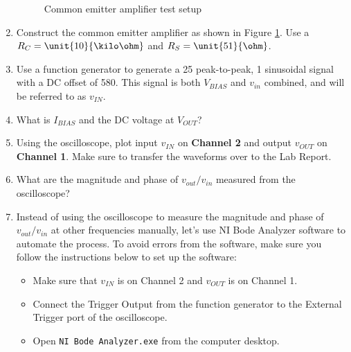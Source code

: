 \documentclass{article}
\begin{document}
\begin{enumerate}

	\begin{figure}[!htb]
		
		\centerline{\box\graph}
		\caption{Common emitter amplifier test setup}
		\label{commonemitter}
	\end{figure}
	
	\item Construct the common emitter amplifier as shown in Figure \ref{commonemitter}. Use a $R_C=\unit{10}{\kilo\ohm}$ and $R_S=\unit{51}{\ohm}$.

	\item Use a function generator to generate a \unit{25}{\milli\volt} peak-to-peak, \unit{1}{\kilo\hertz} sinusoidal signal with a DC offset of \unit{580}{\milli\volt}. This signal is both $V_{BIAS}$ and $v_{in}$ combined, and will be referred to as $v_{IN}$. 
	
	\item What is $I_{BIAS}$ and the DC voltage at $V_{OUT}$?

	\item Using the oscilloscope, plot input $v_{IN}$ on \textbf{Channel 2} and output $v_{OUT}$ on \textbf{Channel 1}. Make sure to transfer the waveforms over to the Lab Report.

	\item What are the magnitude and phase of $v_{out}/v_{in}$ measured from the oscilloscope?

	\item Instead of using the oscilloscope to measure the magnitude and phase of $v_{out}/v_{in}$ at other frequencies manually, let's use NI Bode Analyzer software to automate the process. To avoid errors from the software, make sure you follow the instructions below to set up the software:

	\begin{itemize}
		\item Make sure that $v_{IN}$ is on Channel 2 and $v_{OUT}$ is on Channel 1.

		\item Connect the Trigger Output from the function generator to the External Trigger port of the oscilloscope.
		
		\item Open \verb|NI Bode Analyzer.exe| from the computer desktop.


\end{itemize}
\end{enumerate}
\end{document}
